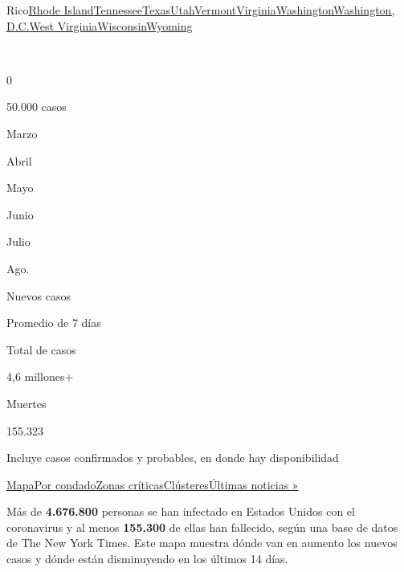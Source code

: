 {Rico}\href{https://www.nytimes3xbfgragh.onion/interactive/2020/us/rhode-island-coronavirus-cases.html}{Rhode
Island}\href{https://www.nytimes3xbfgragh.onion/interactive/2020/us/tennessee-coronavirus-cases.html}{Tennessee}\href{https://www.nytimes3xbfgragh.onion/interactive/2020/us/texas-coronavirus-cases.html}{Texas}\href{https://www.nytimes3xbfgragh.onion/interactive/2020/us/utah-coronavirus-cases.html}{Utah}\href{https://www.nytimes3xbfgragh.onion/interactive/2020/us/vermont-coronavirus-cases.html}{Vermont}\href{https://www.nytimes3xbfgragh.onion/interactive/2020/us/virginia-coronavirus-cases.html}{Virginia}\href{https://www.nytimes3xbfgragh.onion/interactive/2020/us/washington-coronavirus-cases.html}{Washington}\href{https://www.nytimes3xbfgragh.onion/interactive/2020/us/washington-dc-coronavirus-cases.html}{Washington,
D.C.}\href{https://www.nytimes3xbfgragh.onion/interactive/2020/us/west-virginia-coronavirus-cases.html}{West
Virginia}\href{https://www.nytimes3xbfgragh.onion/interactive/2020/us/wisconsin-coronavirus-cases.html}{Wisconsin}\href{https://www.nytimes3xbfgragh.onion/interactive/2020/us/wyoming-coronavirus-cases.html}{Wyoming}

~

0

50.000 casos

Marzo

Abril

Mayo

Junio

Julio

Ago.

Nuevos casos

Promedio de 7 días

Total de casos

4,6 millones+

Muertes

155.323

Incluye casos confirmados y probables, en donde hay disponibilidad

\protect\hyperlink{map}{Mapa}\protect\hyperlink{states}{Por
condado}\protect\hyperlink{hotspots}{Zonas
críticas}\protect\hyperlink{clusters}{Clústeres}\href{https://www.nytimes3xbfgragh.onion/2020/08/02/world/coronavirus-covid-19.html}{Últimas
noticias »}

Más de \textbf{4.676.800} personas se han infectado en Estados Unidos
con el coronavirus y al menos \textbf{155.300} de ellas han fallecido,
según una base de datos de The New York Times. Este mapa muestra dónde
van en aumento los nuevos casos y dónde están disminuyendo en los
últimos 14 días.

